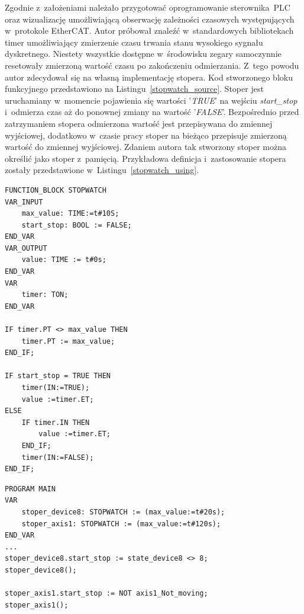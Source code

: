 Zgodnie z~założeniami należało przygotować oprogramowanie sterownika~PLC oraz wizualizację umożliwiającą obserwację zależności czasowych występujących w~protokole EtherCAT. Autor próbował znaleźć w~standardowych bibliotekach timer umożliwiający zmierzenie czasu trwania stanu wysokiego sygnału dyskretnego. Niestety wszystkie dostępne w~środowisku zegary samoczynnie resetowały zmierzoną wartość czasu po zakończeniu odmierzania. Z~tego powodu autor zdecydował się na własną implementację stopera. Kod stworzonego bloku funkcyjnego przedstawiono na Listingu~\ref{stopwatch_source}. Stoper jest uruchamiany w~momencie pojawienia się wartości '\textit{TRUE}' na wejściu \textit{start\_stop} i~odmierza czas aż do ponownej zmiany na wartość '\textit{FALSE}'. Bezpośrednio przed zatrzymaniem stopera odmierzona wartość jest przepisywana do zmiennej wyjściowej, dodatkowo w~czasie pracy stoper na bieżąco przepisuje zmierzoną wartość do zmiennej wyjściowej. Zdaniem autora tak stworzony stoper można określić jako stoper z~pamięcią. Przykładowa definicja i~zastosowanie stopera zostały przedstawione w~Listingu~\ref{stopwatch_using}.
\clearpage
\begin{lstlisting}[caption={Kod źródłowy stopera.},label=stopwatch_source]
FUNCTION_BLOCK STOPWATCH
VAR_INPUT
	max_value: TIME:=t#10S;
	start_stop: BOOL := FALSE;
END_VAR
VAR_OUTPUT
	value: TIME := t#0s;
END_VAR
VAR
	timer: TON;
END_VAR

IF timer.PT <> max_value THEN
	timer.PT := max_value;
END_IF;

IF start_stop = TRUE THEN
	timer(IN:=TRUE);
	value :=timer.ET;
ELSE
	IF timer.IN THEN
		value :=timer.ET;
	END_IF;
	timer(IN:=FALSE);
END_IF;
\end{lstlisting}

\begin{lstlisting}[caption={Wywołania odmierzania czasu stworzonym \\ blokiem funkcyjnym \textit{STOPWATCH}.},label=stopwatch_using]
PROGRAM MAIN
VAR
	stoper_device8: STOPWATCH := (max_value:=t#20s);
	stoper_axis1: STOPWATCH := (max_value:=t#120s);
END_VAR	
...
stoper_device8.start_stop := state_device8 <> 8;
stoper_device8();

stoper_axis1.start_stop := NOT axis1_Not_moving;
stoper_axis1();
\end{lstlisting}

